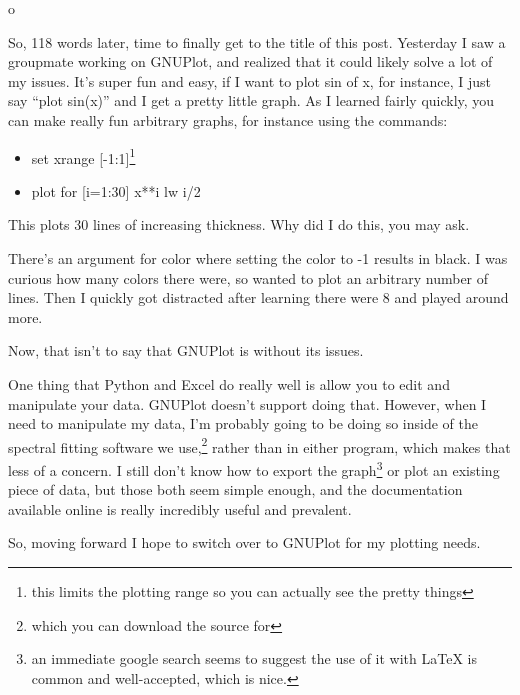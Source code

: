 o\documentclass[12pt]{article}[titlepage]
\newcommand{\say}[1]{``#1''}
\newcommand{\1}{\={a}}
\newcommand{\2}{\={e}}
\newcommand{\3}{\={\i}}
\newcommand{\4}{\=o}
\newcommand{\5}{\=u}
\newcommand{\6}{\={A}}
\renewcommand{\,}{\textsuperscript{,}}
\begin{document}
So, 118 words later, time to finally get to the title of this post.
Yesterday I saw a groupmate working on GNUPlot, and realized that it could likely solve a lot of my issues.
It's super fun and easy, if I want to plot sin of x, for instance, I just say \say{plot sin(x)} and I get a pretty little graph.
As I learned fairly quickly, you can make really fun arbitrary graphs, for instance using the commands:
\begin{itemize}
\item set xrange [-1:1]\footnote{this limits the plotting range so you can actually see the pretty things}
\item plot for [i=1:30] x**i lw i/2
\end{itemize}
This plots 30 lines of increasing thickness.
Why did I do this, you may ask.

There's an argument for color where setting the color to -1 results in black.
I was curious how many colors there were, so wanted to plot an arbitrary number of lines.
Then I quickly got distracted after learning there were 8 and played around more.

Now, that isn't to say that GNUPlot is without its issues.

One thing that Python and Excel do really well is allow you to edit and manipulate your data.
GNUPlot doesn't support doing that.
However, when I need to manipulate my data, I'm probably going to be doing so inside of the spectral fitting software we use,\footnote{which you can download the source for} rather than in either program, which makes that less of a concern.
I still don't know how to export the graph\footnote{an immediate google search seems to suggest the use of it with LaTeX is common and well-accepted, which is nice.} or plot an existing piece of data, but those both seem simple enough, and the documentation available online is really incredibly useful and prevalent.

So, moving forward I hope to switch over to GNUPlot for my plotting needs.
\end{document}
